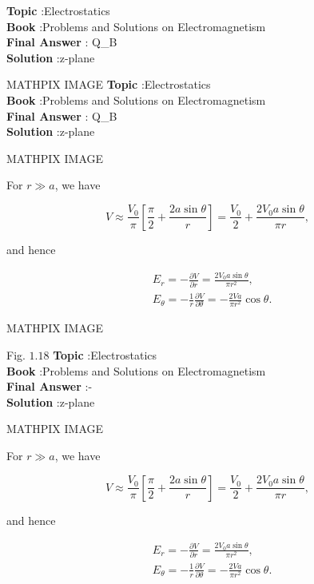 \documentclass[10pt]{article}
\begin{document}
\textbf{Topic} :Electrostatics\\
\textbf{Book} :Problems and Solutions on Electromagnetism\\
\textbf{Final Answer} : Q_{B}\\


\textbf{Solution} :z-plane

MATHPIX IMAGE
\textbf{Topic} :Electrostatics\\
\textbf{Book} :Problems and Solutions on Electromagnetism\\
\textbf{Final Answer} : Q_{B}\\


\textbf{Solution} :z-plane

MATHPIX IMAGE

 For $r \gg a$, we have

$$
V \approx \frac{V_{0}}{\pi}\left[\frac{\pi}{2}+\frac{2 a \sin \theta}{r}\right]=\frac{V_{0}}{2}+\frac{2 V_{0} a \sin \theta}{\pi r},
$$

and hence

$$
\begin{aligned}
&E_{r}=-\frac{\partial V}{\partial r}=\frac{2 V_{0} a \sin \theta}{\pi r^{2}}, \\
&E_{\theta}=-\frac{1}{r} \frac{\partial V}{\partial \theta}=-\frac{2 V a}{\pi r^{2}} \cos \theta .
\end{aligned}
$$

MATHPIX IMAGE

Fig. $1.18$
\textbf{Topic} :Electrostatics\\
\textbf{Book} :Problems and Solutions on Electromagnetism\\
\textbf{Final Answer} :- \cos \theta\\


\textbf{Solution} :z-plane

MATHPIX IMAGE

 For $r \gg a$, we have

$$
V \approx \frac{V_{0}}{\pi}\left[\frac{\pi}{2}+\frac{2 a \sin \theta}{r}\right]=\frac{V_{0}}{2}+\frac{2 V_{0} a \sin \theta}{\pi r},
$$

and hence

$$
\begin{aligned}
&E_{r}=-\frac{\partial V}{\partial r}=\frac{2 V_{0} a \sin \theta}{\pi r^{2}}, \\
&E_{\theta}=-\frac{1}{r} \frac{\partial V}{\partial \theta}=-\frac{2 V a}{\pi r^{2}} \cos \theta .
\end{aligned}
$$
\end{document}
